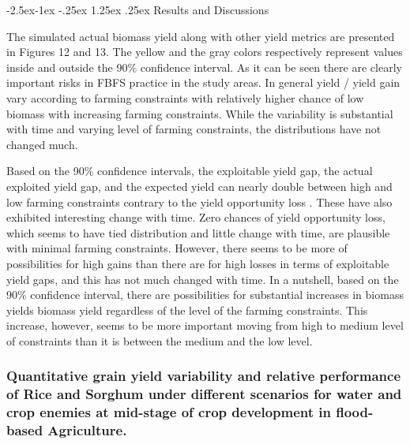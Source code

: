 \documentclass[12pt,oneside]{article}
\makeatletter
\renewcommand\paragraph{\@startsection{paragraph}{4}{\z@}%
            {-2.5ex\@plus -1ex \@minus -.25ex}%
            {1.25ex \@plus .25ex}%
            {\normalfont\normalsize\bfseries}}
\makeatother
\begin{document}
\hypertarget{results-and-discussions-1}{%
\paragraph{Results and Discussions}\label{results-and-discussions-1}}

The simulated actual biomass yield along with other yield metrics are
presented in Figures 12 and 13. The yellow and the gray colors
respectively represent values inside and outside the 90\% confidence
interval. As it can be seen there are clearly important risks in FBFS
practice in the study areas. In general yield / yield gain vary
according to farming constraints with relatively higher chance of low
biomass with increasing farming constraints. While the variability is
substantial with time and varying level of farming constraints, the
distributions have not changed much.

Based on the 90\% confidence intervals, the exploitable yield gap, the
actual exploited yield gap, and the expected yield can nearly double
between high and low farming constraints contrary to the yield
opportunity loss . These have also exhibited interesting change with
time. Zero chances of yield opportunity loss, which seems to have tied
distribution and little change with time, are plausible with minimal
farming constraints. However, there seems to be more of possibilities
for high gains than there are for high losses in terms of exploitable
yield gaps, and this has not much changed with time. In a nutshell,
based on the 90\% confidence interval, there are possibilities for
substantial increases in biomass yields biomass yield regardless of the
level of the farming constraints. This increase, however, seems to be
more important moving from high to medium level of constraints than it
is between the medium and the low level.

\hypertarget{quantitative-grain-yield-variability-and-relative-performance-of-rice-and-sorghum-under-different-scenarios-for-water-and-crop-enemies-at-mid-stage-of-crop-development-in-flood-based-agriculture.}{%
\subsubsection{Quantitative grain yield variability and relative
performance of Rice and Sorghum under different scenarios for water and
crop enemies at mid-stage of crop development in flood-based
Agriculture.}\label{quantitative-grain-yield-variability-and-relative-performance-of-rice-and-sorghum-under-different-scenarios-for-water-and-crop-enemies-at-mid-stage-of-crop-development-in-flood-based-agriculture.}}
\end{document}
